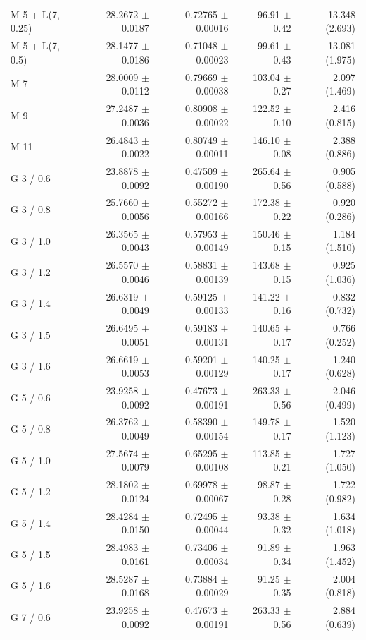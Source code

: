 \begin{longtable}{lrrrr}
M 5 + L(7, 0.25) & 28.2672 $\pm$ 0.0187 & 0.72765 $\pm$ 0.00016 & 96.91 $\pm$ 0.42 & 13.348 (2.693) \\
M 5 + L(7, 0.5) & 28.1477 $\pm$ 0.0186 & 0.71048 $\pm$ 0.00023 & 99.61 $\pm$ 0.43 & 13.081 (1.975) \\
M 7 & 28.0009 $\pm$ 0.0112 & 0.79669 $\pm$ 0.00038 & 103.04 $\pm$ 0.27 & 2.097 (1.469) \\
M 9 & 27.2487 $\pm$ 0.0036 & 0.80908 $\pm$ 0.00022 & 122.52 $\pm$ 0.10 & 2.416 (0.815) \\
M 11 & 26.4843 $\pm$ 0.0022 & 0.80749 $\pm$ 0.00011 & 146.10 $\pm$ 0.08 & 2.388 (0.886) \\
G 3 / 0.6 & 23.8878 $\pm$ 0.0092 & 0.47509 $\pm$ 0.00190 & 265.64 $\pm$ 0.56 & 0.905 (0.588) \\
G 3 / 0.8 & 25.7660 $\pm$ 0.0056 & 0.55272 $\pm$ 0.00166 & 172.38 $\pm$ 0.22 & 0.920 (0.286) \\
G 3 / 1.0 & 26.3565 $\pm$ 0.0043 & 0.57953 $\pm$ 0.00149 & 150.46 $\pm$ 0.15 & 1.184 (1.510) \\
G 3 / 1.2 & 26.5570 $\pm$ 0.0046 & 0.58831 $\pm$ 0.00139 & 143.68 $\pm$ 0.15 & 0.925 (1.036) \\
G 3 / 1.4 & 26.6319 $\pm$ 0.0049 & 0.59125 $\pm$ 0.00133 & 141.22 $\pm$ 0.16 & 0.832 (0.732) \\
G 3 / 1.5 & 26.6495 $\pm$ 0.0051 & 0.59183 $\pm$ 0.00131 & 140.65 $\pm$ 0.17 & 0.766 (0.252) \\
G 3 / 1.6 & 26.6619 $\pm$ 0.0053 & 0.59201 $\pm$ 0.00129 & 140.25 $\pm$ 0.17 & 1.240 (0.628) \\
G 5 / 0.6 & 23.9258 $\pm$ 0.0092 & 0.47673 $\pm$ 0.00191 & 263.33 $\pm$ 0.56 & 2.046 (0.499) \\
G 5 / 0.8 & 26.3762 $\pm$ 0.0049 & 0.58390 $\pm$ 0.00154 & 149.78 $\pm$ 0.17 & 1.520 (1.123) \\
G 5 / 1.0 & 27.5674 $\pm$ 0.0079 & 0.65295 $\pm$ 0.00108 & 113.85 $\pm$ 0.21 & 1.727 (1.050) \\
G 5 / 1.2 & 28.1802 $\pm$ 0.0124 & 0.69978 $\pm$ 0.00067 & 98.87 $\pm$ 0.28 & 1.722 (0.982) \\
G 5 / 1.4 & 28.4284 $\pm$ 0.0150 & 0.72495 $\pm$ 0.00044 & 93.38 $\pm$ 0.32 & 1.634 (1.018) \\
G 5 / 1.5 & 28.4983 $\pm$ 0.0161 & 0.73406 $\pm$ 0.00034 & 91.89 $\pm$ 0.34 & 1.963 (1.452) \\
G 5 / 1.6 & 28.5287 $\pm$ 0.0168 & 0.73884 $\pm$ 0.00029 & 91.25 $\pm$ 0.35 & 2.004 (0.818) \\
G 7 / 0.6 & 23.9258 $\pm$ 0.0092 & 0.47673 $\pm$ 0.00191 & 263.33 $\pm$ 0.56 & 2.884 (0.639) \\

\end{longtable}
